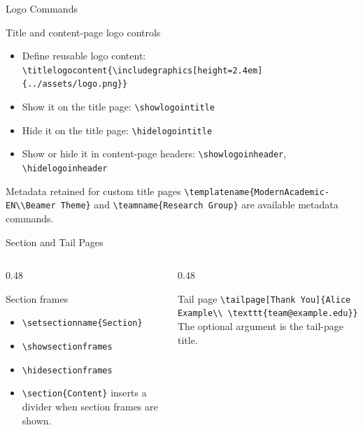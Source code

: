 \documentclass[aspectratio=169,10pt]{beamer}
\begin{document}
\begin{academicframe}{Logo Commands}
  \begin{block}{Title and content-page logo controls}
    \scriptsize
    \begin{itemize}
      \item Define reusable logo content:
        \texttt{\textbackslash titlelogocontent\{\textbackslash includegraphics[height=2.4em]\{../assets/logo.png\}\}}
      \item Show it on the title page:
        \texttt{\textbackslash showlogointitle}
      \item Hide it on the title page:
        \texttt{\textbackslash hidelogointitle}
      \item Show or hide it in content-page headers:
        \texttt{\textbackslash showlogoinheader},
        \texttt{\textbackslash hidelogoinheader}
    \end{itemize}
  \end{block}

  \vspace{0.35em}
  \begin{exampleblock}{Metadata retained for custom title pages}
    \scriptsize
    \texttt{\textbackslash templatename\{ModernAcademic-EN\textbackslash\textbackslash Beamer Theme\}}
    and \texttt{\textbackslash teamname\{Research Group\}} are available metadata
    commands.
  \end{exampleblock}
\end{academicframe}

\begin{academicframe}{Section and Tail Pages}
  \begin{columns}[T,onlytextwidth]
    \begin{column}{0.48\textwidth}
      \begin{block}{Section frames}
        \scriptsize
        \begin{itemize}
          \item \texttt{\textbackslash setsectionname\{Section\}}
          \item \texttt{\textbackslash showsectionframes}
          \item \texttt{\textbackslash hidesectionframes}
          \item \texttt{\textbackslash section\{Content\}} inserts a divider when section frames are shown.
        \end{itemize}
      \end{block}
    \end{column}
    \begin{column}{0.48\textwidth}
      \begin{exampleblock}{Tail page}
        \scriptsize
        \texttt{\textbackslash tailpage[Thank You]\{Alice Example\textbackslash\textbackslash
        \textbackslash texttt\{team@example.edu\}\}}\\[0.7em]
        The optional argument is the tail-page title.
      \end{exampleblock}
    \end{column}
  \end{columns}
\end{academicframe}
\end{document}
